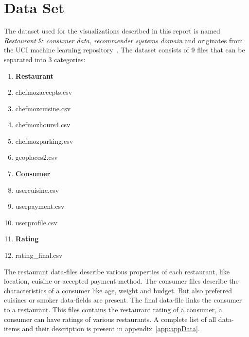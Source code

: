 \section{Data Set}\label{sec:data}

The dataset used for the visualizations described in this report is named \emph{Restaurant $\&$ consumer data, recommender systems domain} and originates from the UCI machine learning repository~\cite{WinNT}.
The dataset consists of 9 files that can be separated into 3 categories:
\begin{enumerate}
  \item[] \textbf{Restaurant}
  \item chefmozaccepts.csv
  \item chefmozcuisine.csv
  \item chefmozhours4.csv
  \item chefmozparking.csv
  \item geoplaces2.csv
  \item[] \textbf{Consumer}
  \item usercuisine.csv
  \item userpayment.csv
  \item userprofile.csv
  \item[] \textbf{Rating}
  \item rating\_final.csv
\end{enumerate}
The restaurant data-files describe various properties of each restaurant, like location, cuisine or accepted payment method.
The consumer files describe the characteristics of a consumer like age, weight and budget.
But also preferred cuisines or smoker data-fields are present.
The final data-file links the consumer to a restaurant.
This files contains the restaurant rating of a consumer, a consumer can have ratings of various restaurants.
A complete list of all data-items and their description is present in appendix~\ref{app:appData}.


